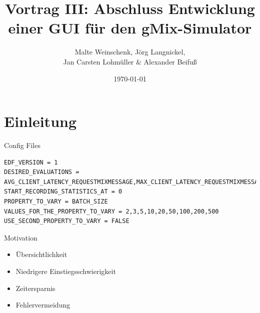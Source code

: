 \documentclass{beamer}
\title{Vortrag III: Abschluss Entwicklung einer GUI für den gMix-Simulator}
\author[M. Weinschenk, J. Langnickel, J.C. Lohmüller, A. Beifuß]{Malte Weinschenk, Jörg Langnickel, \\ Jan Carsten Lohmüller \& Alexander Beifuß}
\date{\today}
\begin{document}
\frame{\titlepage} 


\section[Einleitung]{Einleitung}

\begin{frame}[fragile]{Config Files}
    \begin{lstlisting}
EDF_VERSION = 1
DESIRED_EVALUATIONS = AVG_CLIENT_LATENCY_REQUESTMIXMESSAGE,MAX_CLIENT_LATENCY_REQUESTMIXMESSAGE
START_RECORDING_STATISTICS_AT = 0
PROPERTY_TO_VARY = BATCH_SIZE
VALUES_FOR_THE_PROPERTY_TO_VARY = 2,3,5,10,20,50,100,200,500
USE_SECOND_PROPERTY_TO_VARY = FALSE
    \end{lstlisting}
    \begin{block}{Motivation}
                \begin{itemize}
                \item Übersichtlichkeit
                \item Niedrigere Einstiegsschwierigkeit
                \item Zeitersparnis
                \item Fehlervermeidung
        \end{itemize}
    \end{block}
\end{frame}
\end{document}
